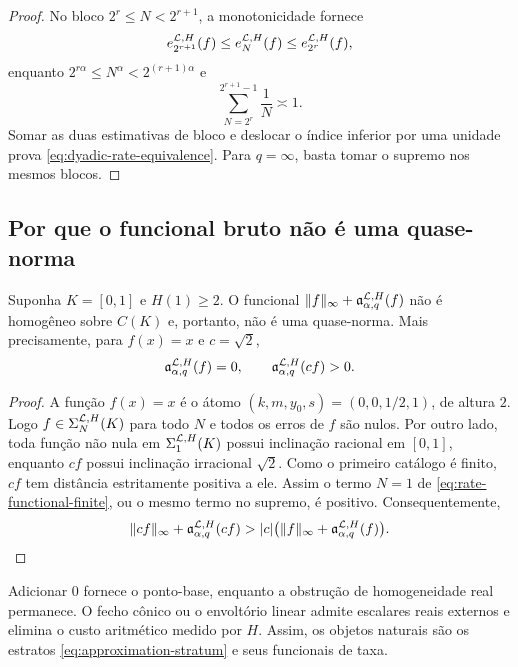 \begin{proof}
No bloco $2^r\le N<2^{r+1}$, a monotonicidade fornece
\[
 e_{2^{r+1}}^{\mathcal{L},H}(f)
 \le e_N^{\mathcal{L},H}(f)
 \le e_{2^r}^{\mathcal{L},H}(f),
\]
enquanto $2^{r\alpha}\le N^\alpha<2^{(r+1)\alpha}$ e
\[
 \sum_{N=2^r}^{2^{r+1}-1}\frac1N\asymp1.
\]
Somar as duas estimativas de bloco e deslocar o índice inferior por uma
unidade prova \eqref{eq:dyadic-rate-equivalence}. Para $q=\infty$, basta
tomar o supremo nos mesmos blocos.
\end{proof}

\subsection{Por que o funcional bruto não é uma quase-norma}

\begin{proposition}
\label{prop:nonhomogeneous-functional}
Suponha $K=[0,1]$ e $H(1)\ge2$. O funcional
$\|f\|_\infty+\mathfrak a_{\alpha,q}^{\mathcal{L},H}(f)$ não é homogêneo sobre
$C(K)$ e, portanto, não é uma quase-norma. Mais precisamente, para
$f(x)=x$ e $c=\sqrt2$,
\begin{equation}
 \mathfrak a_{\alpha,q}^{\mathcal{L},H}(f)=0,
 \qquad
 \mathfrak a_{\alpha,q}^{\mathcal{L},H}(cf)>0.
 \label{eq:nonhomogeneous-certificate}
\end{equation}
\end{proposition}

\begin{proof}
A função $f(x)=x$ é o átomo $(k,m,y_0,s)=(0,0,1/2,1)$, de altura $2$.
Logo $f\in\Sigma_N^{\mathcal{L},H}(K)$ para todo $N$ e todos os erros de
$f$ são nulos. Por outro lado, toda função não nula em
$\Sigma_1^{\mathcal{L},H}(K)$ possui inclinação racional em $[0,1]$, enquanto
$cf$ possui inclinação irracional $\sqrt2$. Como o primeiro catálogo é
finito, $cf$ tem distância estritamente positiva a ele. Assim o termo
$N=1$ de \eqref{eq:rate-functional-finite}, ou o mesmo termo no supremo,
é positivo. Consequentemente,
\[
 \|cf\|_\infty+\mathfrak a_{\alpha,q}^{\mathcal{L},H}(cf)
 >|c|\bigl(\|f\|_\infty+
 \mathfrak a_{\alpha,q}^{\mathcal{L},H}(f)\bigr).
\]
\end{proof}

\begin{remark}
\label{rem:quasinorm-scope}
Adicionar $0$ fornece o ponto-base, enquanto a obstrução de homogeneidade real
permanece. O fecho cônico ou o envoltório linear admite escalares reais
externos e elimina o custo aritmético medido por $H$. Assim, os objetos
naturais são os estratos \eqref{eq:approximation-stratum} e seus funcionais de
taxa.
\end{remark}
